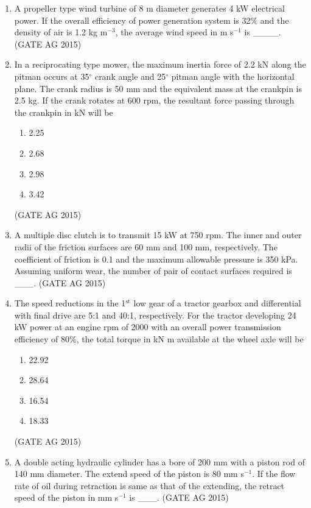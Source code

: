 \documentclass[journal,12pt,onecolumn]{IEEEtran}
\theoremstyle{remark}
\begin{document}
\begin{enumerate}
\item 
A propeller type wind turbine of 8 m diameter generates 4 kW electrical power. If the overall efficiency of power generation system is 32\% and the density of air is 1.2 kg m$^{-3}$, the average wind speed in m s$^{-1}$ is \_\_\_\_.  
\hfill{(GATE AG 2015)}

\item 
In a reciprocating type mower, the maximum inertia force of 2.2 kN along the pitman occurs at 35$^\circ$ crank angle and 25$^\circ$ pitman angle with the horizontal plane. The crank radius is 50 mm and the equivalent mass at the crankpin is 2.5 kg. If the crank rotates at 600 rpm, the resultant force passing through the crankpin in kN will be
\begin{multicols}{4}
  \begin{enumerate}
      \item 2.25
      \item 2.68
      \item 2.98
      \item 3.42
  \end{enumerate}
  \end{multicols}
\hfill{(GATE AG 2015)}

\item 
A multiple disc clutch is to transmit 15 kW at 750 rpm. The inner and outer radii of the friction surfaces are 60 mm and 100 mm, respectively. The coefficient of friction is 0.1 and the maximum allowable pressure is 350 kPa. Assuming uniform wear, the number of pair of contact surfaces required is \_\_\_.
\hfill{(GATE AG 2015)}

\item 
The speed reductions in the 1$^{\text{st}}$ low gear of a tractor gearbox and differential with final drive are 5:1 and 40:1, respectively. For the tractor developing 24 kW power at an engine rpm of 2000 with an overall power transmission efficiency of 80\%, the total torque in kN m available at the wheel axle will be
\begin{multicols}{4}
  \begin{enumerate}
      \item 22.92
      \item 28.64
      \item 16.54
      \item 18.33
  \end{enumerate}
  \end{multicols}
\hfill{(GATE AG 2015)}

  \item A double acting hydraulic cylinder has a bore of 200 mm with a piston rod of 140 mm diameter. The extend speed of the piston is 80 mm s$^{-1}$. If the flow rate of oil during retraction is same as that of the extending, the retract speed of the piston in mm s$^{-1}$ is \_\_\_.
\hfill{(GATE AG 2015)}



\end{enumerate}
\end{document}
